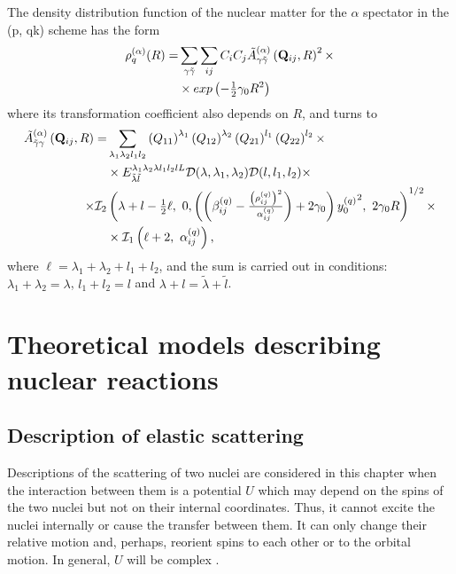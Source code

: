 \documentclass[
12pt, %
oneside, %
english, %
onehalfspacing, %
onehalfspacing, %
headsepline, %
]{MastersDoctoralThesis} %
\begin{document}
The density distribution function of the nuclear matter for the $\alpha$ spectator in the (p, qk) scheme has the form
\begin{align}
\rho_q^{(\alpha)}(R)= &
\sum_{\gamma \tilde{\gamma}}
\sum_{ij}
C_i C_j
\tilde{A}^{(\alpha)}_{\gamma\tilde{\gamma}}\left( {\bf Q}_{ij}, R \right)^2
\times \nonumber \\
& \times
exp \left( -\tfrac{1}{2} 
\gamma_0 R^2
\right)
\label{pqk_density_a}
\end{align}
where its transformation coefficient also depends on $R$, and  turns to
\begin{align}
\tilde{A}^{(\alpha)}_{\tilde{\gamma}\gamma}\left( {\bf Q}_{ij}, R \right) = & \sum_{\lambda_1 \lambda_2 l_1 l_2} 
\left({ Q}_{11} \right)^{\lambda_1} 
\left({ Q}_{12} \right)^{\lambda_2} 
\left({ Q}_{21} \right)^{l_1} 
\left({ Q}_{22}\right)^{l_2} 
\times \nonumber
\\
& \times {E}^{\lambda_1 \lambda_2 \lambda l_1 l_2 l L}_{\tilde{\lambda} \tilde{l} } \mathcal{D}(\lambda,\lambda_1,\lambda_2) \mathcal{D}(l,l_1,l_2)
\times  \nonumber    \\
 \times 
 \mathcal{I}_2 & \left( \lambda + l - \tfrac{1}{2} \ell, 
~0, 
\left( \left(  \beta^{(q)}_{ij} - \tfrac{\left(\rho^{(q)}_{ij}\right)^2}{\alpha^{(q)}_{ij}} \right) +2 \gamma_0 \right) {y_0^{(q)}}^2,~
2\gamma_0 R
 \right)^{1/2} \times \nonumber \\
& \times  \mathcal{I}_1 \left( \ell +2,~ \alpha_{ij}^{(q)} \right)
 ,
\end{align}
where $\ell=\lambda_1+\lambda_2+l_1+l_2$, and the sum is carried out in conditions: $\lambda_1+\lambda_2=\lambda$, $l_1+l_2=l$ and $\lambda+l=\tilde{\lambda}+\tilde{l}$.

\chapter{Theoretical models describing nuclear reactions} %

\label{Chapter2} %


\section{Description of elastic scattering}
Descriptions of the scattering of two nuclei are considered in this chapter when the interaction between them is a potential $U$ which may depend on the spins of the two nuclei but not on their internal coordinates. Thus, it cannot excite the nuclei internally or cause the transfer between them. It can only change their relative motion and, perhaps, reorient spins to each other or to the orbital motion. In general, $U$ will be complex \cite{satchler1983}. 
\end{document}
